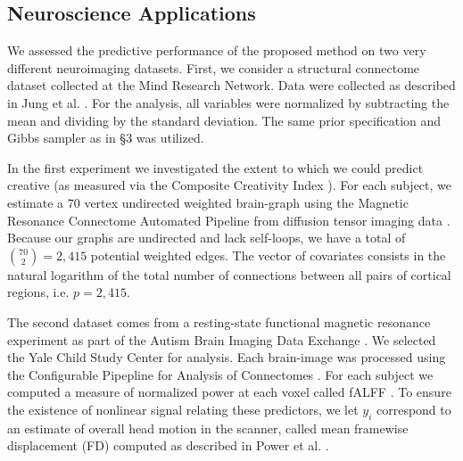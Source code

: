 

\subsection{Neuroscience Applications} \label{sub:real}

We assessed the predictive performance of the proposed method on two very different neuroimaging datasets. First, we consider a structural connectome dataset collected at the Mind Research Network.  Data were collected as described in Jung et al. \cite{Jung2010}. For the analysis, all variables were normalized by subtracting the mean and dividing by the standard deviation. The same prior specification and Gibbs sampler as in \S 3 was  utilized. 

In the first experiment we investigated the extent to which we could predict creative (as measured via the Composite Creativity Index \cite{Arden2010}).   For each subject, we estimate a $70$ vertex undirected weighted brain-graph using the Magnetic Resonance Connectome Automated Pipeline \cite{MRCAP11} from diffusion tensor imaging data \cite{Mori2006}. Because our graphs are undirected and lack self-loops, we have a total of $\binom{70}{2}=2,415$ potential weighted edges. The vector of covariates consists in the natural logarithm of the total number of connections between all pairs of cortical regions, i.e. $p=2,415$. 

The second dataset comes from a resting-state functional magnetic resonance experiment as part of the Autism Brain Imaging Data Exchange \cite{Autism}.  We selected the Yale Child Study Center for analysis.  Each brain-image was processed using the Configurable Pipepline for Analysis of Connectomes \cite{cpac}. For each subject we computed a measure of normalized power at each voxel called fALFF \cite{Zou2008}.  To ensure the existence of nonlinear signal relating these predictors, we let $y_i$ correspond to an estimate of overall head motion in the scanner, called mean framewise displacement (FD) computed as described in Power et al. \cite{power}. 

